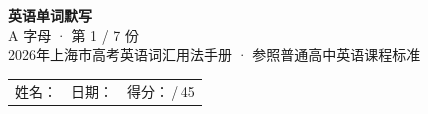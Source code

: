 \documentclass[10pt,a4paper]{article}
\begin{document}
\pagestyle{plain}

\begin{center}
{\LARGE\bfseries 英语单词默写}\\[0.22em]
{\large A 字母 · 第 1 / 7 份}\\[0.18em]
{\small 2026年上海市高考英语词汇用法手册 · 参照普通高中英语课程标准}
\end{center}

\vspace{0.25em}
\noindent\begin{tabular}{@{}p{}@{}p{}@{}p{}@{}}
姓名：\underline{\hspace{2.0cm}} & 日期：\underline{\hspace{2.0cm}} & 得分：\underline{\hspace{1.3cm}}\,/\,45 \\
\end{tabular}

\vspace{0.3em}

\vspace{0.08em}
\end{document}
